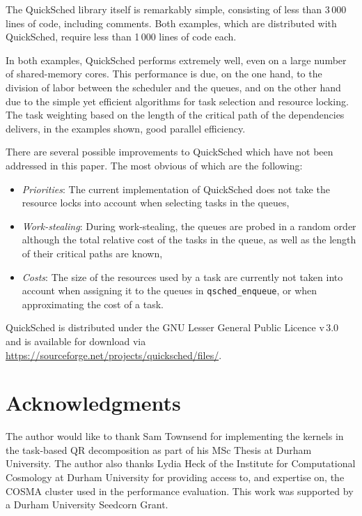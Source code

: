 \documentclass[preprint]{elsarticle}
\begin{document}
The QuickSched library itself is remarkably simple, consisting of
less than 3\,000 lines of code, including comments.
Both examples, which are distributed with QuickSched,
require less than 1\,000 lines of code each.

In both examples, QuickSched performs extremely well, even
on a large number of shared-memory cores.
This performance is due, on the one hand, to the
division of labor between the scheduler and the queues,
and on the other hand due to the simple yet efficient
algorithms for task selection and resource locking.
The task weighting based on the length of the critical
path of the dependencies delivers, in the examples shown,
good parallel efficiency.

There are several possible improvements to QuickSched which
have not been addressed in this paper.
The most obvious of which are the following:
\begin{itemize}
    \item {\em Priorities}: The current implementation of
        QuickSched does not take the resource locks into
        account when selecting tasks in the queues,
    \item {\em Work-stealing}: During work-stealing, the
        queues are probed in a random order although
        the total relative cost of the tasks in the queue,
        as well as the length of their critical paths are
        known,
    \item {\em Costs}: The size of the resources used by
        a task are currently not taken into account when
        assigning it to the queues in {\tt qsched\_enqueue},
        or when approximating the cost of a task.
\end{itemize}

QuickSched is distributed under the GNU Lesser General Public Licence
v\,3.0 and is available for download via
\url{https://sourceforge.net/projects/quicksched/files/}.


\section*{Acknowledgments}
The author would like to thank Sam Townsend for implementing the
kernels in the task-based QR decomposition as part of his MSc Thesis
at Durham University.
The author also thanks Lydia Heck of the Institute for
Computational Cosmology at Durham University for providing access
to, and expertise on, the COSMA cluster used in the performance
evaluation.
This work was supported by a Durham University Seedcorn Grant.
\end{document}
